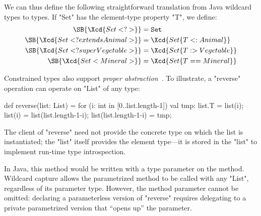 \noindent
We can thus define the following straightforward translation
from Java wildcard types to \Xten{} types.  If \xcd"Set"
has the element-type property \xcd"T", we define:
{\footnotesize
\begin{align*}
\SB{ \Xcd{Set<?>} } &= {\tt Set} \\
\SB{ \Xcd{Set<? extends Animal>} } &= \Xcd{Set\{T <: Animal\}} \\
\SB{ \Xcd{Set<? super Vegetable>} } &= \Xcd{Set\{T :> Vegetable\}} \\
\SB{ \Xcd{Set<Mineral>} } &= \Xcd{Set\{T == Mineral\}}
\end{align*}}


Constrained types also support \emph{proper
abstraction}~\cite{adding-wildcards}.  To illustrate, a
\xcd"reverse"
operation can operate on \xcd"List" of any type:
{\footnotesize
\begin{xten}
def reverse(list: List) = {
  for (i: int in [0..list.length-1]) {
    val tmp: list.T = list(i);
    list(i) = list(list.length-1-i);
    list(list.length-1-i) = tmp;
  }
}
\end{xten}}

The client of \xcd"reverse" need not provide the concrete type
on which the list is instantiated; the \xcd"list" itself
provides the element type---it is stored in the \xcd"list"
to implement run-time type introspection.

In Java, this method would be written with a type parameter on
the method.
Wildcard
capture allows the parametrized method to be called with any \xcd"List",
regardless of its parameter type.
However,
the method parameter cannot be omitted: declaring a parameterless version
of \xcd"reverse" requires delegating to a private parametrized version that
``opens up'' the parameter.


